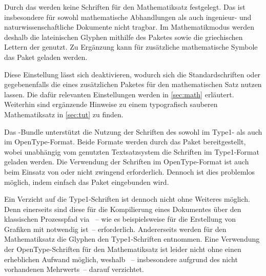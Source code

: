 \begin{Declaration*}{}
\begin{Declaration*}{}
\begin{Declaration*}{}
Durch das \CD werden keine Schriften für den Mathematiksatz festgelegt. Das ist 
insbesondere für sowohl mathematische Abhandlungen als auch ingenieur- und 
naturwissenschaftliche Dokumente nicht tragbar. Im Mathematikmodus werden 
deshalb die lateinischen Glyphen mithilfe des Paketes 
sowie die griechischen Lettern der \OpenSans genutzt. Zu Ergänzung kann für 
zusätzliche mathematische Symbole das Paket  geladen werden.

Diese Einstellung lässt sich deaktivieren, wodurch sich die Standardschriften 
oder gegebenenfalls die eines zusätzlichen Paketes für den mathematischen Satz 
nutzen lassen. Die dafür relevanten Einstellungen werden in \autoref{sec:math} 
erläutert. Weiterhin sind ergänzende Hinweise zu einem typografisch sauberen
Mathematiksatz in \autoref{sec:tut} zu finden.


%
%
%
Das \TUDScript-Bundle unterstützt die Nutzung der Schriften des \CDs sowohl 
im Type1- als auch im OpenType-Format. Beide Formate werden durch das Paket 
 bereitgestellt, wobei unabhängig vom genutzten 
Textsatzsystem die Schriften im Type1-Format geladen werden. Die Verwendung der 
Schriften im OpenType-Format ist auch beim Einsatz von  oder 
 nicht zwingend erforderlich. Dennoch ist dies problemlos 
möglich, indem einfach das Paket  eingebunden wird.

Ein Verzicht auf die Type1-Schriften ist dennoch nicht ohne Weiteres möglich. 
Denn einerseits sind diese für die Kompilierung eines Dokumentes über den 
klassischen Prozesspfad via ~-- wie es 
beispielsweise für die Erstellung von Grafiken mit  notwendig 
ist~-- erforderlich. Andererseits werden für den Mathematiksatz die Glyphen den 
Type1-Schriften entnommen. Eine Verwendung der OpenType-Schriften für den 
Mathematiksatz ist leider nicht ohne einen erheblichen Aufwand möglich, weshalb 
\TUDScript~-- insbesondere aufgrund des nicht vorhandenen Mehrwerts~-- darauf 
verzichtet.
%




\end{Declaration*}
\end{Declaration*}
\end{Declaration*}
